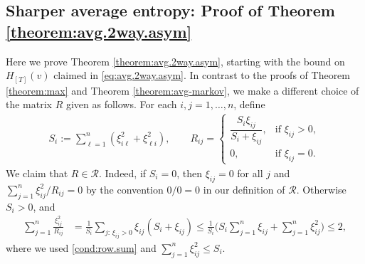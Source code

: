 \documentclass[11pt,reqno]{amsart}
\numberwithin{equation}{section}
\theoremstyle{definition}
\begin{document}
\subsection{Sharper average entropy: Proof of Theorem \ref{theorem:avg.2way.asym}} \label{se:proof:sharper}

Here we prove Theorem \ref{theorem:avg.2way.asym}, starting with the bound on $H_{[T]}(v)$ claimed in \eqref{eq:avg.2way.asym}.  In contrast to the proofs of Theorem \ref{theorem:max} and Theorem \ref{theorem:avg-markov}, we make a different choice of the matrix $R$ given as follows. For each $i,j = 1, \dots, n$, define 
\begin{align*}
	S_i := \sum_{\ell=1}^n (\xi_{i\ell}^2 + \xi_{\ell i}^2), \qquad R_{ij}
	=
	\begin{cases}
		\dfrac{S_i \xi_{ij}}{S_i + \xi_{ij}}, & \text{if } \xi_{ij} > 0, \\
		0, & \text{if } \xi_{ij} = 0 .
	\end{cases}
\end{align*}
We claim  that $R \in \mathcal{R}$. Indeed, if $S_i=0$, then
$\xi_{ij}=0$ for all $j$ and $\sum_{j=1}^n \xi_{ij}^2/R_{ij}=0$ by the convention $0/0=0$ in our definition of $\mathcal{R}$. Otherwise $S_i>0$, and
\begin{align*}
	\sum_{j=1}^n \frac{\xi_{ij}^2}{R_{ij}}
	&=
	\frac{1}{S_i}\sum_{j:\,\xi_{ij}>0}\xi_{ij}(S_i+\xi_{ij})
	\le
	\frac{1}{S_i}\Big(S_i\sum_{j=1}^n\xi_{ij}+\sum_{j=1}^n\xi_{ij}^2\Big)
	\le 2,
\end{align*}
where we used \eqref{cond:row.sum} and $\sum_{j=1}^n\xi_{ij}^2\le S_i$.
\end{document}

